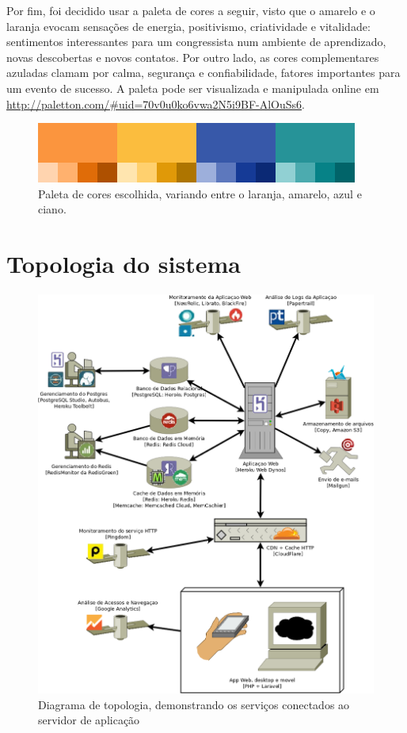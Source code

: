 \documentclass[12pt,a4paper,twoside,hyphens,english,brazil]{abntex2}
\begin{document}
{Por fim, foi decidido usar a paleta de cores a seguir, visto que o amarelo e o laranja evocam sensações de energia, positivismo, criatividade e vitalidade: sentimentos interessantes para um congressista num ambiente de aprendizado, novas descobertas e novos contatos. Por outro lado, as cores complementares azuladas clamam por calma, segurança e confiabilidade, fatores importantes para um evento de sucesso. A paleta pode ser visualizada e manipulada online em \url{http://paletton.com/#uid=70v0u0ko6vwa2N5i9BF-AlOuSs6}.\cite{colors-marketo}\cite{colors-creative}

\begin{figure}[h!]
\centering
	\includegraphics[width=0.6\linewidth]{imagens/paleta.png}
	\caption{Paleta de cores escolhida, variando entre o laranja, amarelo, azul e ciano.}
\end{figure}

\section{Topologia do sistema}

\begin{figure}
\centering
	\includegraphics[width=1\linewidth]{diagramas/topologia-comum.png}
	\caption{Diagrama de topologia, demonstrando os serviços conectados ao servidor de aplicação}
\end{figure}

}
\end{document}
